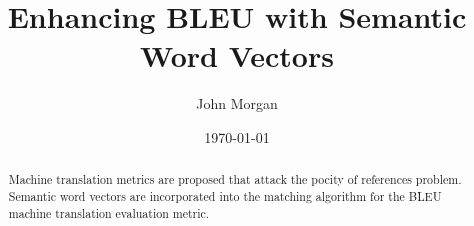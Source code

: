 \documentclass{article}
\title{Enhancing BLEU  with Semantic Word Vectors}
\author{John Morgan}
\date{\today}
\begin{document}
\maketitle
\begin{abstract}
Machine translation metrics are proposed that attack the pocity of references problem. 
Semantic word vectors are incorporated into the matching algorithm for the BLEU machine translation evaluation metric. 

\end{abstract}







\end{document}
